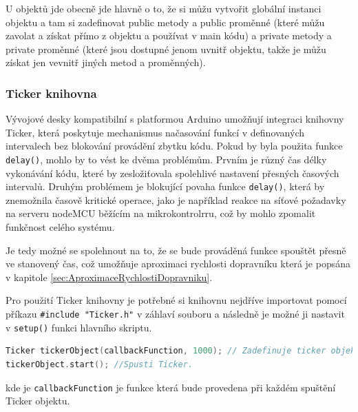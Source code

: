 U objektů jde obecně jde hlavně o to, že si můžu vytvořit globální instanci objektu a tam si zadefinovat public metody a public proměnné (které můžu zavolat a získat přímo z objektu a používat v main kódu) a private metody a private proměnné (které jsou dostupné jenom uvnitř objektu, takže je můžu získat jen vevnitř jiných metod a proměnných).

\subsubsection{Ticker knihovna}\label{sec:TickerKnihovna}

Vývojové desky kompatibilní s platformou Arduino umožňují integraci knihovny Ticker, která poskytuje mechanismus načasování funkcí v definovaných intervalech bez blokování provádění zbytku kódu. Pokud by byla použita funkce \texttt{delay()}, mohlo by to vést ke dvěma problémům. Prvním je různý čas délky vykonávání kódu, které by zesložiťovala spolehlivé nastavení přesných časových intervalů. Druhým problémem je blokující povaha funkce \texttt{delay()}, která by znemožnila časově kritické operace, jako je například reakce na síťové požadavky na serveru nodeMCU běžícím na mikrokontrolrru, což by mohlo zpomalit funkčnost celého systému. \cite{TickerKnihovna}

Je tedy možné se spolehnout na to, že se bude prováděná funkce spouštět přesně ve stanovený čas, což umožňuje aproximaci rychlosti dopravníku která je popsána v kapitole \ref{sec:AproximaceRychlostiDopravniku}.

Pro použití Ticker knihovny je potřebné si knihovnu nejdříve importovat pomocí příkazu \texttt{\#include "Ticker.h"} v záhlaví souboru a následně je možné ji nastavit v \texttt{setup()} funkci hlavního skriptu.

\begin{lstlisting}[language=C++, caption={Použití ticker knihovny uvnitř \texttt{setup()} funkce \cite{TickerGitHubPage}}, label={lst:TickerUkazka}]
Ticker tickerObject(callbackFunction, 1000); // Zadefinuje ticker objekt
tickerObject.start(); //Spusti Ticker.
\end{lstlisting}
kde je \texttt{callbackFunction} je funkce která bude provedena při každém spuštění Ticker objektu.

